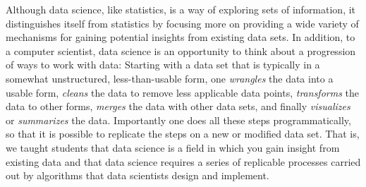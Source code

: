 
Although data science, like statistics, is a way of exploring sets of
information, it distinguishes itself from statistics by focusing more
on providing a wide variety of mechanisms for gaining potential insights
from existing data sets.  In addition, to a computer scientist, data
science is an opportunity to think about a progression of ways to
work with data: Starting with a data set that is typically in a
somewhat unstructured, less-than-usable form, one \textit{wrangles}
the data into a usable form, \textit{cleans} the data to remove
less applicable data points, \textit{transforms} the data to other
forms, \textit{merges} the data with other data sets, and finally
\textit{visualizes} or \textit{summarizes} the data.  Importantly
one does all these steps programmatically, so that it is possible
to replicate the steps on a new or modified data set.
That is, we taught students that data science is a field in which
you gain insight from existing data and that data science requires
a series of replicable processes carried out by algorithms that data
scientists design and implement.
